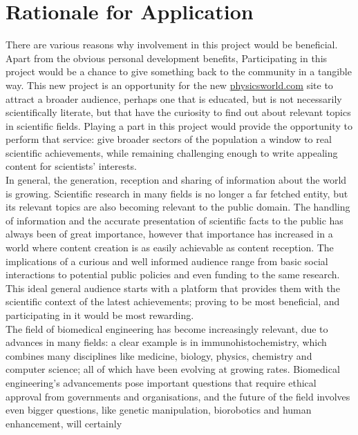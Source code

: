 \section{Rationale for Application}
There are various reasons why involvement in this project would be beneficial.
Apart from the obvious personal development benefits,
Participating in this project would be a chance to give something back to
the community in a tangible way.
This new project is an opportunity for the new \url{physicsworld.com}
site to attract a broader audience, perhaps one that is educated, but is not
necessarily scientifically literate, but that have the curiosity to find out
about relevant topics in scientific fields. Playing a part in this project would
provide the opportunity to perform that service: give broader sectors of the
population a window to real scientific achievements, while remaining challenging
enough to write appealing content for scientists' interests.
\medskip\\In general, the generation, reception and sharing of information
about the world is growing. Scientific research in many fields is no longer a
far fetched entity, but its relevant topics are also becoming relevant to the
public domain. The handling of information and the accurate presentation of
scientific facts to the public has always been of great importance, however
that importance has increased in a world where content creation is as easily
achievable as content reception. The implications of a curious and well informed
audience range from basic social interactions to potential public policies
and even funding to the same research.
This ideal general audience starts with a platform that provides them with the
scientific context of the latest achievements; proving to be most
beneficial, and participating in it would be most rewarding.\medskip\\ The
field of biomedical engineering has become
increasingly relevant, due to advances in many fields: a clear example is in
immunohistochemistry, which combines many disciplines like medicine, biology,
physics, chemistry and computer science; all of which have been evolving at
growing rates.
Biomedical engineering's advancements pose important questions
that require ethical approval from governments and organisations,
and the future of the field involves even bigger questions, like
genetic manipulation, biorobotics and human enhancement, will certainly
